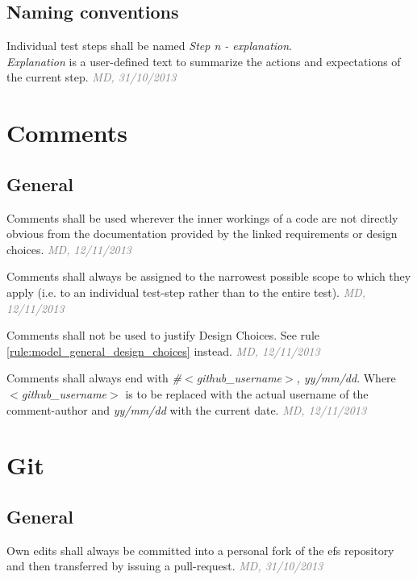 \documentclass[draft, a4paper, oneside]{scrreprt}
\let\emph\textsl
\newcommand{\literally}[1]{\textsf{\emph{#1}}}
\newcommand{\ruleauthor}[2]{\mbox{}\newline\mbox{}\hfill{\footnotesize\textcolor{gray}{\emph{#1, #2}}}\xspace}}
\newcommand{\ruleauthor}[2]{}
\begin{document}
\section{Naming conventions}
\label{rules:tests_naming}
\begin{rules}
\item Individual test steps shall be named \literally{Step n - explanation}.\\ \literally{Explanation} is a user-defined text to summarize the actions and expectations of the current step. \ruleauthor{MD}{31/10/2013}
\end{rules}


\chapter{Comments}

\section{General}
\begin{rules}
\item Comments shall be used wherever the inner workings of a code are not directly obvious from the documentation provided by the linked requirements or design choices. \ruleauthor{MD}{12/11/2013}
\item Comments shall always be assigned to the narrowest possible scope to which they apply (i.e. to an individual test-step rather than to the entire test). \ruleauthor{MD}{12/11/2013}
\item Comments shall not be used to justify Design Choices. See rule \ref{rule:model_general_design_choices} instead. \ruleauthor{MD}{12/11/2013}
\item Comments shall always end with \literally{\#$<$github_username$>$, yy/mm/dd}. Where \literally{$<$github_username$>$} is to be replaced with the actual username of the comment-author and \literally{yy/mm/dd} with the current date. \ruleauthor{MD}{12/11/2013}
\end{rules}


\chapter{Git}
\section{General}
\begin{rules}
\item \label{rule:pullrequest} Own edits shall always be committed into a personal fork of the \gls{efs} repository and then transferred by issuing a pull-request. \ruleauthor{MD}{31/10/2013}
\end{rules}
\end{document}
